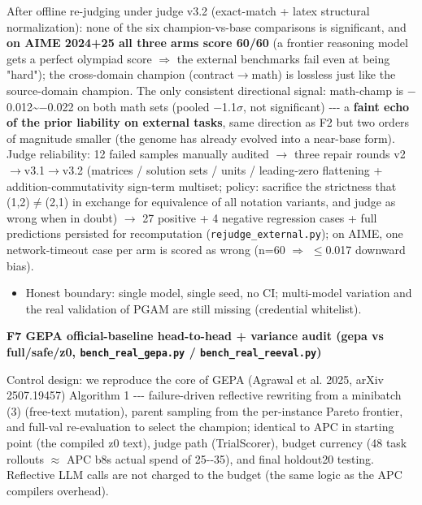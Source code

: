 After offline re-judging under judge v3.2 (exact-match + latex structural normalization): none of the six champion-vs-base comparisons is significant, and \textbf{on AIME 2024+25 all three arms score 60/60} (a frontier reasoning model gets a perfect olympiad score \(\Rightarrow\) the external benchmarks fail even at being "hard"); the cross-domain champion (contract\(\rightarrow\)math) is lossless just like the source-domain champion. The only consistent directional signal: math-champ is \(-\)0.012\textasciitilde{}\(-\)0.022 on both math sets (pooled \(-\)1.1\(\sigma\), not significant) -\/-\/- a \textbf{faint echo of the prior liability on external tasks}, same direction as F2 but two orders of magnitude smaller (the genome has already evolved into a near-base form). Judge reliability: 12 failed samples manually audited \(\rightarrow\) three repair rounds v2\(\rightarrow\)v3.1\(\rightarrow\)v3.2 (matrices / solution sets / units / leading-zero flattening + addition-commutativity sign-term multiset; policy: sacrifice the strictness that (1,2)\(\neq\)(2,1) in exchange for equivalence of all notation variants, and judge as wrong when in doubt) \(\rightarrow\) 27 positive + 4 negative regression cases + full predictions persisted for recomputation (\texttt{rejudge\_external.py}); on AIME, one network-timeout case per arm is scored as wrong (n=60 \(\Rightarrow\) \(\leq\)0.017 downward bias).

\begin{itemize}
\tightlist
\item
  Honest boundary: single model, single seed, no CI; multi-model variation and the real validation of PGAM are still missing (credential whitelist).
\end{itemize}

\textbf{F7 GEPA official-baseline head-to-head + variance audit (gepa vs full/safe/z0, \texttt{bench\_real\_gepa.py} / \texttt{bench\_real\_reeval.py})}

Control design: we reproduce the core of GEPA (Agrawal et al. 2025, arXiv 2507.19457) Algorithm 1 -\/-\/- failure-driven reflective rewriting from a minibatch (3) (free-text mutation), parent sampling from the per-instance Pareto frontier, and full-val re-evaluation to select the champion; identical to APC in starting point (the compiled z0 text), judge path (TrialScorer), budget currency (48 task rollouts \(\approx\) APC b8\textquotesingle s actual spend of 25-\/-35), and final holdout20 testing. Reflective LLM calls are not charged to the budget (the same logic as the APC compiler\textquotesingle s overhead).

